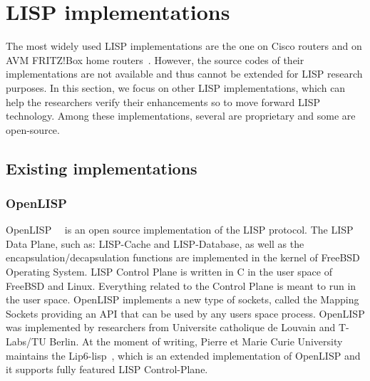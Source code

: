 \section{LISP implementations}
\label{sec:implementation}
The most widely used LISP implementations are the one on Cisco routers and on AVM FRITZ!Box home routers~\cite{AVMFritzBox}. %
However, the source codes of their implementations are not available and thus cannot be extended for LISP research purposes. In this section, we focus on other LISP implementations, which can help the researchers verify their enhancements so to move forward LISP technology. Among these implementations, several are proprietary and some are open-source. %

\subsection{Existing implementations}
\label{subsec:implementation_existing}

\subsubsection{OpenLISP}
\label{subsubsec:implementation_OpenLISP}
OpenLISP~\cite{OpenLISP}~\cite{phung2014openlisp} is an open source implementation of the LISP protocol. The LISP Data Plane, such as: LISP-Cache and LISP-Database, as well as the encapsulation/decapsulation functions are implemented in the kernel of FreeBSD~\cite{freeBSD} Operating System. LISP Control Plane is written in C in the user space of FreeBSD and Linux. Everything related to the Control Plane is meant to run in the user space. %
OpenLISP implements a new type of sockets, called the Mapping Sockets providing an API that can be used by any users space process. OpenLISP was implemented by researchers from Universite catholique de Louvain and T-Labs/TU Berlin. At the moment of writing, Pierre et Marie Curie University maintains the Lip6-lisp~\cite{lip6lisp}, which is an extended implementation of OpenLISP and it supports fully featured LISP Control-Plane.


